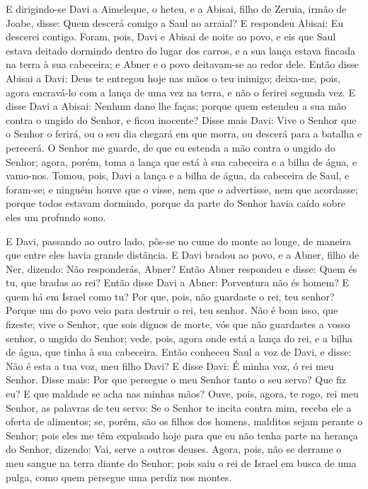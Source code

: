 E dirigindo-se Davi a Aimeleque, o heteu, e a Abisai, filho de
Zeruia, irmão de Joabe, disse: Quem descerá comigo a Saul ao
arraial? E respondeu Abisai: Eu descerei contigo. Foram, pois,
Davi e Abisai de noite ao povo, e eis que Saul estava deitado
dormindo dentro do lugar dos carros, e a sua lança estava fincada na
terra à sua cabeceira; e Abner e o povo deitavam-se ao redor dele.
Então disse Abisai a Davi: Deus te entregou hoje nas mãos o teu
inimigo; deixa-me, pois, agora encravá-lo com a lança de uma vez na
terra, e não o ferirei segunda vez. E disse Davi a Abisai:
Nenhum dano lhe faças; porque quem estendeu a sua mão contra o
ungido do Senhor, e ficou inocente? Disse mais Davi: Vive o
Senhor que o Senhor o ferirá, ou o seu dia chegará em que morra, ou
descerá para a batalha e perecerá. O Senhor me guarde, de que
eu estenda a mão contra o ungido do Senhor; agora, porém, toma a
lança que está à sua cabeceira e a bilha de água, e vamo-nos.
Tomou, pois, Davi a lança e a bilha de água, da cabeceira de
Saul, e foram-se; e ninguém houve que o visse, nem que o advertisse,
nem que acordasse; porque todos estavam dormindo, porque da parte do
Senhor havia caído sobre eles um profundo sono.

E Davi, passando ao outro lado, pôs-se no cume do monte ao longe,
de maneira que entre eles havia grande distância. E Davi
bradou ao povo, e a Abner, filho de Ner, dizendo: Não responderás,
Abner? Então Abner respondeu e disse: Quem és tu, que bradas ao rei?
Então disse Davi a Abner: Porventura não és homem? E quem há
em Israel como tu? Por que, pois, não guardaste o rei, teu senhor?
Porque um do povo veio para destruir o rei, teu senhor. Não é
bom isso, que fizeste; vive o Senhor, que sois dignos de morte, vós
que não guardastes a vosso senhor, o ungido do Senhor; vede, pois,
agora onde está a lança do rei, e a bilha de água, que tinha à sua
cabeceira. Então conheceu Saul a voz de Davi, e disse: Não é
esta a tua voz, meu filho Davi? E disse Davi: É minha voz, ó rei meu
Senhor. Disse mais: Por que persegue o meu Senhor tanto o seu
servo? Que fiz eu? E que maldade se acha nas minhas mãos?
Ouve, pois, agora, te rogo, rei meu Senhor, as palavras de
teu servo: Se o Senhor te incita contra mim, receba ele a oferta de
alimentos; se, porém, são os filhos dos homens, malditos sejam
perante o Senhor; pois eles me têm expulsado hoje para que eu não
tenha parte na herança do Senhor, dizendo: Vai, serve a outros
deuses. Agora, pois, não se derrame o meu sangue na terra
diante do Senhor; pois saiu o rei de Israel em busca de uma pulga,
como quem persegue uma perdiz nos montes.

